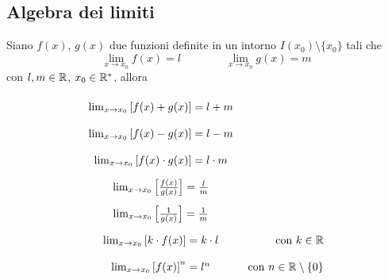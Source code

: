 \documentclass{book}     %
\begin{document}
\subsection{Algebra dei limiti}
\begin{shadedTheorem}
    Siano $f(x)$, $g(x)$ due funzioni definite in un intorno $I(x_0)\setminus \{x_0\}$ tali che
    \[\lim_{x\to x_0}f(x)=l\qquad \qquad \lim_{x\to x_0}g(x)=m\]
    con $l,m\in \mathbb{R}$, $x_0\in \mathbb{R}^\ast$, allora
    \[\renewcommand{\arraystretch}{2}
        \begin{array}{cr}
        \lim_{x\to x_0}\left[ f(x) + g(x) \right] = l + m\\
        \lim_{x\to x_0}\left[ f(x) - g(x) \right] = l - m\\
        \lim_{x\to x_0}\left[ f(x) \cdot g(x) \right] = l \cdot m\\
        \lim_{x\to x_0}\left[ \frac{f(x)}{g(x)} \right] = \frac{l}{m}\\
        \lim_{x\to x_0}\left[ \frac{1}{g(x)} \right] = \frac{1}{m}\\
        \lim_{x\to x_0}\left[ k\cdot f(x)\right] = k\cdot l & \qquad\text{ con }k\in \R\\
        \lim_{x\to x_0}\left[ f(x) \right]^n = l^n & \text{ con }n\in \R\setminus\{0\}
    \end{array}\]
\end{shadedTheorem}
\end{document}

